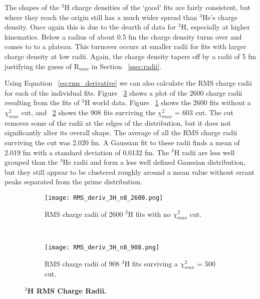 The shapes of the $^3$H charge densities of the `good' fits are fairly consistent, but where they reach the origin still has a much wider spread than $^3$He's charge density. Once again this is due to the dearth of data for $^3$H, especially at higher kinematics. Below a radius of about 0.5 fm the charge density turns over and comes to to a plateau. This turnover occurs at smaller radii for fits with larger charge density at low radii. Again, the charge density tapers off by a radii of 5 fm justifying the guess of R$_{max}$ in Section ~\ref{ssec:radii}. %

Using Equation ~\ref{eq:rms_derivative} we can also calculate the RMS charge radii for each of the individual fits. Figure ~\ref{fig:3h_rms_deriv} shows a plot of the 2600 charge radii resulting from the fits of $^3$H world data. Figure ~\ref{fig:3h_rms_deriv_no_cut} shows the 2600 fits without a $\chi^2_{max}$ cut, and ~\ref{fig:3h_rms_deriv_cut} shows the 908 fits surviving the $\chi^2_{max}$ = 603 cut. The cut removes some of the radii at the edges of the distribution, but it does not significantly alter its overall shape. The average of all the RMS charge radii surviving the cut was 2.020 fm. A Gaussian fit to these radii finds a mean of 2.019 fm with a standard deviation of 0.0132 fm. The $^3$H radii are less well grouped than the $^3$He radii and form a less well defined Gaussian distribution, but they still appear to be clustered roughly around a mean value without errant peaks separated from the prime distribution.%

\begin{figure}[!ht]
\begin{subfigure}{1.\textwidth}
  \centering
  \texttt{[image: RMS\_deriv\_3H\_n8\_2600.png]}
  \caption{RMS charge radii of 2600 $^3$H fits with no $\chi^2_{max}$ cut.}
  \label{fig:3h_rms_deriv_no_cut}
\end{subfigure}\\
\begin{subfigure}{1.\textwidth}
  \centering
  \texttt{[image: RMS\_deriv\_3H\_n8\_908.png]}
  \caption{RMS charge radii of 908 $^3$H fits surviving a $\chi^2_{max}$ = 500 cut.}
  \label{fig:3h_rms_deriv_cut}
\end{subfigure}
\caption{\bf{$^3$H RMS Charge Radii.}}
\label{fig:3h_rms_deriv}
\end{figure}

